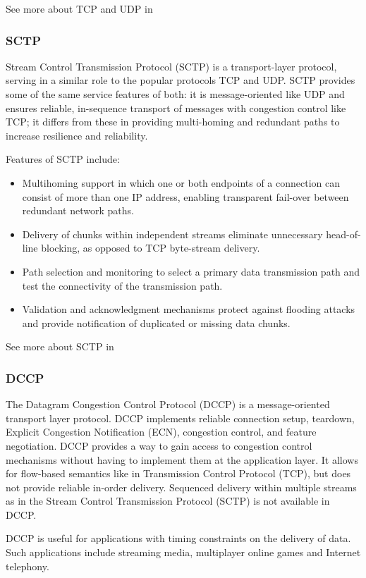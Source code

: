 See more about TCP and UDP in \cite{IP_TCP_UDP}

\subsubsection{SCTP}
Stream Control Transmission Protocol (SCTP) is a transport-layer protocol, serving in a similar role to the popular protocols TCP and UDP. SCTP provides some of the same service features of both: it is message-oriented like UDP and ensures reliable, in-sequence transport of messages with congestion control like TCP; it differs from these in providing multi-homing and redundant paths to increase resilience and reliability.

Features of SCTP include:
\begin{itemize}
\item Multihoming support in which one or both endpoints of a connection can consist of more than one IP address, enabling transparent fail-over between redundant network paths.
\item Delivery of chunks within independent streams eliminate unnecessary head-of-line blocking, as opposed to TCP byte-stream delivery.
\item Path selection and monitoring to select a primary data transmission path and test the connectivity of the transmission path.
\item Validation and acknowledgment mechanisms protect against flooding attacks and provide notification of duplicated or missing data chunks.
\end{itemize}

See more about SCTP in \cite{SCTP}

\subsubsection{DCCP}
The Datagram Congestion Control Protocol (DCCP) is a message-oriented transport layer protocol. DCCP implements reliable connection setup, teardown, Explicit Congestion Notification (ECN), congestion control, and feature negotiation. DCCP provides a way to gain access to congestion control mechanisms without having to implement them at the application layer. It allows for flow-based semantics like in Transmission Control Protocol (TCP), but does not provide reliable in-order delivery. Sequenced delivery within multiple streams as in the Stream Control Transmission Protocol (SCTP) is not available in DCCP.

DCCP is useful for applications with timing constraints on the delivery of data. Such applications include streaming media, multiplayer online games and Internet telephony.

